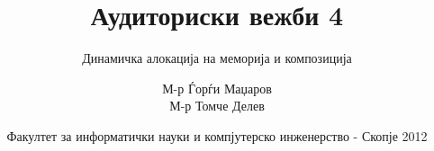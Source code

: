 

\author[АВ4]{М-р Ѓорѓи Маџаров\\М-р Томче Делев}
\title[Објектно ориентирано програмирање]{Аудиториски вежби 4}
\subtitle{Динамичка алокација на меморија и композиција}
\date{Факултет за информатички науки и компјутерско инженерство - Скопје 2012}





\frame[t,plain]{\titlepage}









